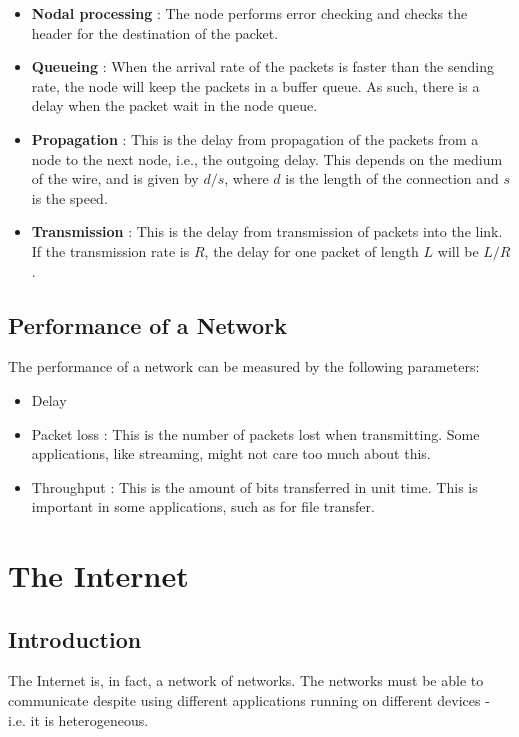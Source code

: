 \documentclass[12pt,letterpaper]{book}
\theoremstyle{definition}
\begin{document}
\begin{itemize}
  \item \textbf{Nodal processing} : The node performs error checking and checks the header for the destination of the packet.
  \item \textbf{Queueing} : When the arrival rate of the packets is faster than the sending rate, the node will keep the packets in a buffer queue. As such, there is a delay when the packet wait in the node queue.
  \item \textbf{Propagation} : This is the delay from propagation of the packets from a node to the next node, i.e., the outgoing delay. This depends on the medium of the wire, and is given by $d/s$, where $d$ is the length of the connection and $s$ is the speed.
  \item \textbf{Transmission} : This is the delay from transmission of packets into the link. If the transmission rate is $R$, the delay for one packet of length $L$ will be $L/R$.
\end{itemize}

\section{Performance of a Network}

The performance of a network can be measured by the following parameters:

\begin{itemize}
  \item Delay
  \item Packet loss : This is the number of packets lost when transmitting. Some applications, like streaming, might not care too much about this.
  \item Throughput : This is the amount of bits transferred in unit time. This is important in some applications, such as for file transfer.
\end{itemize}

\chapter{The Internet}

\section{Introduction}

The Internet is, in fact, a network of networks. The networks must be able to communicate despite using different applications running on different devices - i.e. it is heterogeneous.
\end{document}
